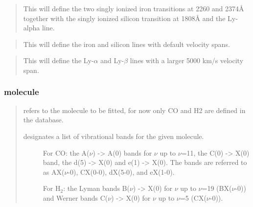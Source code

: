 \documentclass[letterpaper,10pt,english]{sphinxmanual}
\begin{document}
\begin{sphinxShadowBox}

\begin{quote}

This will define the two singly ionized iron transitions at 2260 and 2374Å
together with the singly ionized silicon transition at 1808Å and the Ly-alpha line.
\end{quote}

\begin{quote}

This will define the iron and silicon lines with default velocity spans.
\end{quote}

\begin{quote}

This will define the Ly-\(\alpha\) and Ly-\(\beta\) lines with a larger 5000 km/s velocity span.
\end{quote}
\end{sphinxShadowBox}


\subsubsection{molecule}
\label{\detokenize{documentation:molecule}}
\begin{quote}

 refers to the molecule to be fitted, for now only CO and H2 are defined
in the database.
\begin{description}
\item[{ designates a list of vibrational bands for the given molecule.}] \leavevmode
For CO: the A(\(\nu\)) -\textgreater{} A(0) bands for \(\nu\) up to \(\nu\)=11, the C(0) -\textgreater{} X(0) band, the d(5) -\textgreater{} X(0)
and e(1) -\textgreater{} X(0). The bands are referred to as AX(\(\nu\)-0), CX(0-0), dX(5-0), and eX(1-0).

For H$_{\text{2}}$: the Lyman bands B(\(\nu\)) -\textgreater{} X(0) for \(\nu\) up to \(\nu\)=19 (BX(\(\nu\)-0)) and Werner bands
C(\(\nu\)) -\textgreater{} X(0) for \(\nu\) up to \(\nu\)=5 (CX(\(\nu\)-0)).

\end{description}
\end{quote}
\end{document}

